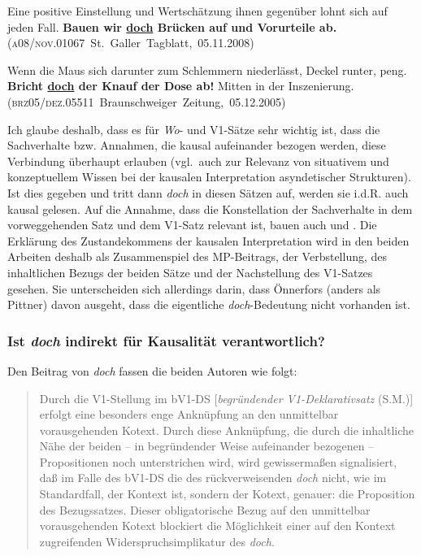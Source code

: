 \begin{exe}
	\ex\label{1029}
	  
	Eine positive Einstellung und Wertschätzung ihnen gegenüber lohnt sich auf jeden Fall. \textbf{Bauen wir \ul{doch} Brücken auf und Vorurteile 		ab.}               
	\newline\hbox{}
	\hfill\hbox{(\textsc{a08/nov.01067} St. Galler Tagblatt, 05.11.2008)}
\end{exe}

\begin{exe}
	\ex\label{1030}
	  
	Wenn die Maus sich darunter zum Schlemmern niederlässt, Deckel runter, peng. \textbf{Bricht \ul{doch} der Knauf der Dose ab!} Mitten in der 			Inszenierung.    
	\newline              		
	\hbox{}\hfill\hbox{(\textsc{brz05/dez.05511} Braunschweiger Zeitung, 05.12.2005)}
\end{exe}
Ich glaube deshalb, dass es für \textit{Wo}- und V1-Sätze sehr wichtig ist, dass die Sachverhalte bzw. Annahmen, die kausal aufeinander bezogen werden, diese Verbindung überhaupt erlauben (vgl.\ auch \citealt[87--128]{Gohl2000} zur Relevanz von situativem und konzeptuellem Wissen bei der kausalen Interpretation  asyndetischer Strukturen). Ist dies gegeben und tritt dann \textit{doch} in diesen Sätzen auf, werden sie i.d.R. auch kausal gelesen. Auf die Annahme, dass die Konstellation der Sachverhalte in dem vorweggehenden Satz und dem V1-Satz relevant ist, bauen auch \citet{Oennerfors1997} und \citet{Pittner2011}. Die Erklärung des Zustandekommens der kausalen Interpretation wird in den beiden Arbeiten deshalb als Zusammenspiel des MP-Beitrags, der Verbstellung, des inhaltlichen Bezugs der beiden Sätze und der Nachstellung des V1-Satzes gesehen. Sie unterscheiden sich allerdings darin, dass Önnerfors (anders als Pittner) davon ausgeht, dass die eigentliche \textit{doch}-Bedeutung nicht vorhanden ist.\pagebreak

\subsubsection{Ist \textit{doch} indirekt für Kausalität verantwortlich?}
\label{sec:kausalind}
Den Beitrag von \textit{doch} fassen die beiden Autoren wie folgt:

\begin{quotation}
Durch die V1-Stellung im bV1-DS [\textit{begründender V1-Deklarativsatz} (S.M.)] erfolgt eine besonders enge Anknüpfung an den unmittelbar vorausgehenden Kotext. Durch diese Anknüpfung, die durch die inhaltliche Nähe der beiden – in begründender Weise aufeinander bezogenen – Propositionen noch unterstrichen wird, wird gewissermaßen signalisiert, daß im Falle des bV1-DS die  des rückverweisenden \textit{doch} nicht, wie im Standardfall, der Kontext ist, sondern der Kotext, genauer: die Proposition des Bezugssatzes. Dieser obligatorische Bezug auf den unmittelbar vorausgehenden Kotext blockiert die Möglichkeit einer auf den Kontext zugreifenden Widerspruchsimplikatur des \textit{doch}.\hfill\hbox{\citet[170]{Oennerfors1997}}
\end{quotation}

